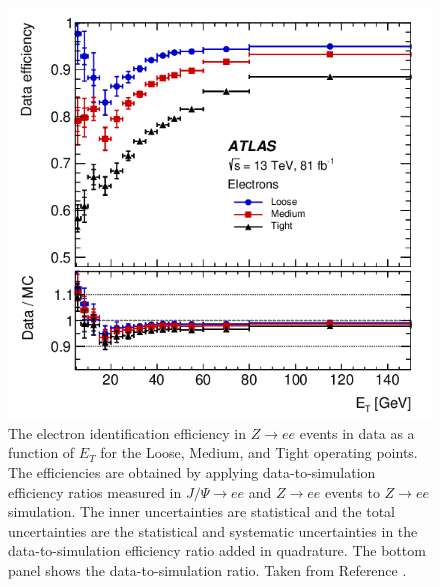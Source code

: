 			\begin{figure}
			\begin{center}
			\includegraphics[width=\textwidth,keepaspectratio=true]{chapters/chapter6_HPlus/images/Electron_ID_Efficiency.png}
			\end{center}
			\caption{The electron identification efficiency in $Z\to ee$ events in data as a function of $E_{T}$ for the Loose, Medium, and Tight operating points. The efficiencies are obtained by applying data-to-simulation efficiency ratios measured in $J/\Psi \to ee$ and $Z \to ee$ events to $Z \to ee$ simulation. The inner uncertainties are statistical and the total uncertainties are the statistical and systematic uncertainties in the data-to-simulation efficiency ratio added in quadrature. The bottom panel shows the data-to-simulation ratio. Taken from Reference \cite{electron-perf}. }
			\label{fig:electron-efficiency}
			\end{figure}

